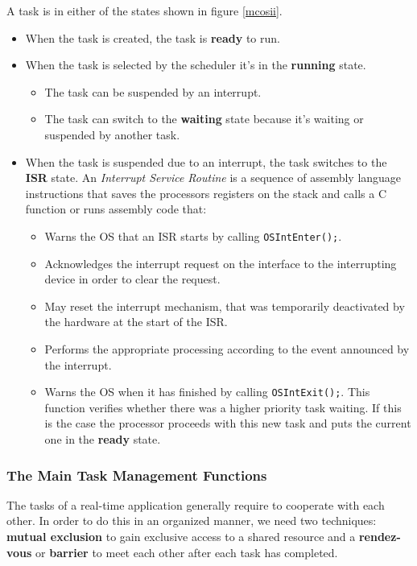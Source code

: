 \documentclass[../main.tex]{subfiles}
\begin{document}
A task is in either of the states shown in figure \ref{mcosii}.
\begin{itemize}
	\item When the task is created, the task is \textbf{ready} to run.
	\item When the task is selected by the scheduler it's in the \textbf{running} state.
	\begin{itemize}
		\item The task can be suspended by an interrupt.
		\item The task can switch to the \textbf{waiting} state because it's waiting or suspended by another task.
	\end{itemize}
	\item When the task is suspended due to an interrupt, the task switches to the \textbf{ISR} state. An \textit{Interrupt Service Routine} is a sequence of assembly language instructions that saves the processors registers on the stack and calls a C function or runs assembly code that:
	\begin{itemize}
	\item Warns the OS that an ISR starts by calling \texttt{OSIntEnter();}.
	\item Acknowledges the interrupt request on the interface to the interrupting device in order to clear the request.
	\item May reset the interrupt mechanism, that was temporarily deactivated by the hardware at the start of the ISR.
	\item Performs the appropriate processing according to the event announced by the interrupt.
	\item Warns the OS when it has finished by calling \texttt{OSIntExit();}. This function verifies whether there was a  higher priority task waiting. If this is the case the processor proceeds with this new task and puts the current one in the \textbf{ready} state.
	\end{itemize}
\end{itemize}

\subsubsection{The Main Task Management Functions}
The tasks of a real-time application generally require to cooperate with each other. In order to do this in an organized manner, we need two techniques: \textbf{mutual exclusion} to gain exclusive access to a shared resource and a \textbf{rendez-vous} or \textbf{barrier} to meet each other after each task has completed.
\end{document}
